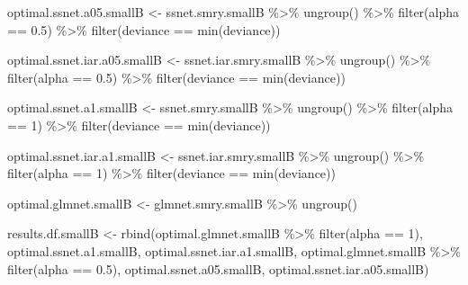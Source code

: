 \documentclass[
]{article}
\newenvironment{Shaded}{\begin{snugshade}}{\end{snugshade}}
\newcommand{\DecValTok}[1]{\textcolor[rgb]{0.00,0.00,0.81}{#1}}
\newcommand{\FloatTok}[1]{\textcolor[rgb]{0.00,0.00,0.81}{#1}}
\newcommand{\FunctionTok}[1]{\textcolor[rgb]{0.00,0.00,0.00}{#1}}
\newcommand{\NormalTok}[1]{#1}
\newcommand{\OtherTok}[1]{\textcolor[rgb]{0.56,0.35,0.01}{#1}}
\newcommand{\SpecialCharTok}[1]{\textcolor[rgb]{0.00,0.00,0.00}{#1}}
\begin{document}
\begin{Shaded}
\begin{Highlighting}[]
\NormalTok{optimal.ssnet.a05.smallB }\OtherTok{\textless{}{-}}\NormalTok{ ssnet.smry.smallB }\SpecialCharTok{\%\textgreater{}\%} 
  \FunctionTok{ungroup}\NormalTok{() }\SpecialCharTok{\%\textgreater{}\%}
  \FunctionTok{filter}\NormalTok{(alpha }\SpecialCharTok{==} \FloatTok{0.5}\NormalTok{) }\SpecialCharTok{\%\textgreater{}\%}
  \FunctionTok{filter}\NormalTok{(deviance }\SpecialCharTok{==} \FunctionTok{min}\NormalTok{(deviance))}

\NormalTok{optimal.ssnet.iar.a05.smallB }\OtherTok{\textless{}{-}}\NormalTok{ ssnet.iar.smry.smallB }\SpecialCharTok{\%\textgreater{}\%}
  \FunctionTok{ungroup}\NormalTok{() }\SpecialCharTok{\%\textgreater{}\%}
  \FunctionTok{filter}\NormalTok{(alpha }\SpecialCharTok{==} \FloatTok{0.5}\NormalTok{) }\SpecialCharTok{\%\textgreater{}\%}
  \FunctionTok{filter}\NormalTok{(deviance }\SpecialCharTok{==} \FunctionTok{min}\NormalTok{(deviance))}

\NormalTok{optimal.ssnet.a1.smallB }\OtherTok{\textless{}{-}}\NormalTok{ ssnet.smry.smallB }\SpecialCharTok{\%\textgreater{}\%} 
  \FunctionTok{ungroup}\NormalTok{() }\SpecialCharTok{\%\textgreater{}\%}
  \FunctionTok{filter}\NormalTok{(alpha }\SpecialCharTok{==} \DecValTok{1}\NormalTok{) }\SpecialCharTok{\%\textgreater{}\%}
  \FunctionTok{filter}\NormalTok{(deviance }\SpecialCharTok{==} \FunctionTok{min}\NormalTok{(deviance))}

\NormalTok{optimal.ssnet.iar.a1.smallB }\OtherTok{\textless{}{-}}\NormalTok{ ssnet.iar.smry.smallB }\SpecialCharTok{\%\textgreater{}\%}
  \FunctionTok{ungroup}\NormalTok{() }\SpecialCharTok{\%\textgreater{}\%}
  \FunctionTok{filter}\NormalTok{(alpha }\SpecialCharTok{==} \DecValTok{1}\NormalTok{) }\SpecialCharTok{\%\textgreater{}\%}
  \FunctionTok{filter}\NormalTok{(deviance }\SpecialCharTok{==} \FunctionTok{min}\NormalTok{(deviance))}

\NormalTok{optimal.glmnet.smallB }\OtherTok{\textless{}{-}}\NormalTok{ glmnet.smry.smallB }\SpecialCharTok{\%\textgreater{}\%}
  \FunctionTok{ungroup}\NormalTok{()}

\NormalTok{results.df.smallB }\OtherTok{\textless{}{-}} \FunctionTok{rbind}\NormalTok{(optimal.glmnet.smallB }\SpecialCharTok{\%\textgreater{}\%} \FunctionTok{filter}\NormalTok{(alpha }\SpecialCharTok{==} \DecValTok{1}\NormalTok{),}
\NormalTok{                           optimal.ssnet.a1.smallB,}
\NormalTok{                           optimal.ssnet.iar.a1.smallB,}
\NormalTok{                           optimal.glmnet.smallB }\SpecialCharTok{\%\textgreater{}\%} \FunctionTok{filter}\NormalTok{(alpha }\SpecialCharTok{==} \FloatTok{0.5}\NormalTok{),}
\NormalTok{                           optimal.ssnet.a05.smallB,}
\NormalTok{                           optimal.ssnet.iar.a05.smallB)}
\end{Highlighting}
\end{Shaded}
\end{document}
